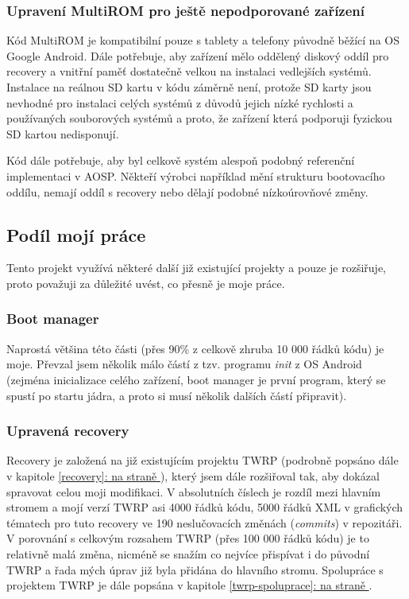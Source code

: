 \documentclass[12pt, a4paper, oneside]{article}
\newcommand{\It}{\textit}  %
\newcommand*{\fullref}[1]{\hyperref[{#1}]{\ref*{#1}: \uv{\nameref*{#1}} na straně \pageref{#1}}}
\begin{document}
\subsubsection{Upravení MultiROM pro ještě nepodporované zařízení}
Kód MultiROM je kompatibilní pouze s tablety a telefony původně běžící na OS Google Android. Dále potřebuje, aby zařízení mělo oddělený diskový oddíl pro recovery a vnitřní paměť dostatečně velkou na instalaci vedlejších systémů. Instalace na reálnou SD kartu v kódu záměrně není, protože SD karty jsou nevhodné pro instalaci celých systémů z důvodů jejich nízké rychlosti a používaných souborových systémů a proto, že zařízení která podporuji fyzickou SD kartou nedisponují.

Kód dále potřebuje, aby byl celkově systém alespoň podobný referenční implementaci v AOSP. Někteří výrobci například mění strukturu bootovacího oddílu, nemají oddíl s recovery nebo dělají podobné nízkoúrovňové změny.

\subsection{Podíl mojí práce}
Tento projekt využívá některé další již existující projekty a pouze je rozšiřuje, proto považuji za důležité uvést, co přesně je moje práce.

\subsubsection{Boot manager}
Naprostá většina této části (přes 90\% z celkově zhruba 10 000 řádků kódu) je moje. Převzal jsem několik málo částí z tzv. programu \It{init} z OS Android (zejména inicializace celého zařízení, boot manager je první program, který se spustí po startu jádra, a proto si musí několik dalších částí připravit).

\subsubsection{Upravená recovery}
Recovery je založená na již existujícím projektu TWRP (podrobně popsáno dále v kapitole \fullref{recovery}), který jsem dále rozšiřoval tak, aby dokázal spravovat celou moji modifikaci. V absolutních číslech je rozdíl mezi hlavním stromem a mojí verzí TWRP asi 4000 řádků kódu, 5000 řádků XML v grafických tématech pro tuto recovery ve 190 neslučovacích změnách (\It{commits}) v repozitáři. V porovnání s celkovým rozsahem TWRP (přes 100 000 řádků kódu) je to relativně malá změna, nicméně se snažím co nejvíce přispívat i do původní TWRP a řada mých úprav již byla přidána do hlavního stromu. Spolupráce s projektem TWRP je dále popsána v kapitole \fullref{twrp-spoluprace}.
\end{document}
